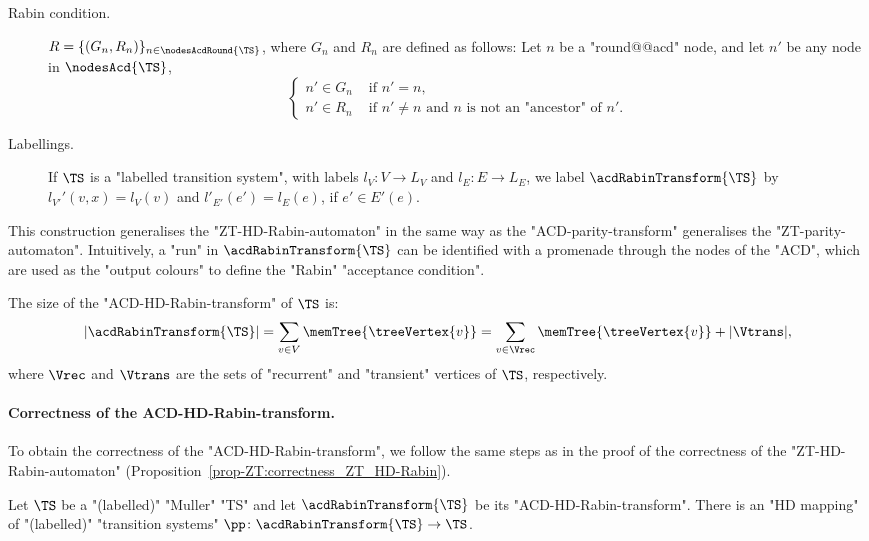 \documentclass{theoretics}
\begin{document}
\begin{definition}
\begin{description}
		\item[Rabin condition.] $R = \{(G_n, R_n)\}_{n\in \nodesAcdRound{\TS}}$, where $G_n$ and $R_n$ are defined as follows: Let $n$ be a "round@@acd" node, and let $n'$ be any node in $\nodesAcd{\TS}$,
		\begin{equation*}
			\begin{cases}
				n' \in G_n & \text{ if } n'=n,\\
				n' \in R_n & \text{ if }  n'\neq n \text{ and } n \text{ is not an "ancestor" of } n'. 
			\end{cases}
		\end{equation*} 	
		
		\item[Labellings.] If $\TS$ is a "labelled transition system", with labels $l_V\colon V \to L_V$ and $l_E\colon E \to L_E$, we label $\acdRabinTransform{\TS}$ by $l_{V'}'(v,x) = l_V(v)$ and $l'_{E'}(e') = l_E(e)$, if $e'\in E'(e)$.
	\end{description}
\end{definition}

This construction generalises the "ZT-HD-Rabin-automaton" in the same way as the "ACD-parity-transform" generalises the "ZT-parity-automaton". Intuitively, a "run" in $\acdRabinTransform{\TS}$ can be identified with a promenade through the nodes of the "ACD", which are used as the "output colours" to define the "Rabin" "acceptance condition".

\begin{remark}\label{rmk-acd:size_acd-RabinHD-transformation}
	The size of the "ACD-HD-Rabin-transform" of $\TS$ is:
	\[|\acdRabinTransform{\TS}| = \sum_{v\in V} \memTree{\treeVertex{v}} = \sum_{v\in \Vrec}\memTree{\treeVertex{v}} + |\Vtrans|,\]
	where $\Vrec$ and $\Vtrans$ are the sets of "recurrent" and "transient" vertices of $\TS$, respectively.
\end{remark}


\paragraph*{Correctness of the ACD-HD-Rabin-transform.} To obtain the correctness of the "ACD-HD-Rabin-transform", we follow the same steps as in the proof of the correctness of the "ZT-HD-Rabin-automaton" (Proposition~\ref{prop-ZT:correctness_ZT_HD-Rabin}).

\begin{proposition}\label{prop-ACD:correctness_ACD-HD-Rabin-transform}
	Let $\TS$ be a "(labelled)" "Muller" "TS" and let $\acdRabinTransform{\TS}$ be its "ACD-HD-Rabin-transform". There is an "HD mapping" of "(labelled)" "transition systems" $\pp\colon \acdRabinTransform{\TS} \to \TS$.
\end{proposition}
\end{document}
